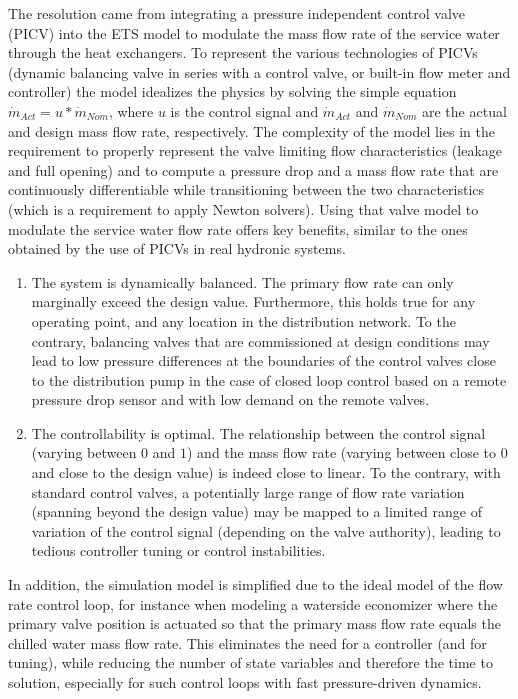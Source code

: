 The resolution came from integrating a pressure independent control valve (PICV) into the ETS model to modulate the mass flow rate of the service water through the heat exchangers.
To represent the various technologies of PICVs (dynamic balancing valve in series with a control valve, or built-in flow meter and controller) the model idealizes the physics by solving the simple equation $ \dot{m}_{Act} = u * \dot{m}_{Nom} $, where $u$ is the control signal and $\dot{m}_{Act}$ and $\dot{m}_{Nom}$ are the actual and design mass flow rate, respectively.
The complexity of the model lies in the requirement to properly represent the valve limiting flow characteristics (leakage and full opening) and to compute a pressure drop and a mass flow rate that are continuously differentiable while transitioning between the two characteristics (which is a requirement to apply Newton solvers).
Using that valve model to modulate the service water flow rate offers  key benefits, similar to the ones obtained by the use of PICVs in real hydronic systems.
\begin{enumerate}
    \item The system is dynamically balanced. The primary flow rate can only marginally exceed the design value. Furthermore, this holds true for any operating point, and any location in the distribution network. To the contrary, balancing valves that are commissioned at design conditions may lead to low pressure differences at the boundaries of the control valves close to the distribution pump in the case of closed loop control based on a remote pressure drop sensor and with low demand on the remote valves.
    \item The controllability is optimal. The relationship between the control signal (varying between $0$ and $1$) and the mass flow rate (varying between close to $0$ and close to the design value) is indeed close to linear. To the contrary, with standard control valves, a potentially large range of flow rate variation (spanning beyond the design value) may be mapped to a limited range of variation of the control signal (depending on the valve authority), leading to tedious controller tuning or control instabilities.
\end{enumerate}
In addition, the simulation model is simplified due to the ideal model of the flow rate control loop, for instance when modeling a waterside economizer where the primary valve position is actuated so that the primary mass flow rate equals the chilled water mass flow rate. This eliminates the need for a controller (and for tuning), while reducing the number of state variables and therefore the time to solution, especially for such control loops with fast pressure-driven dynamics.

